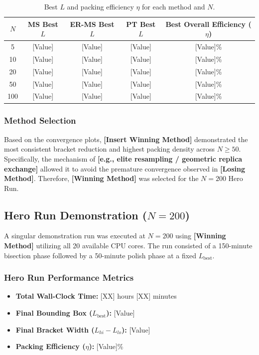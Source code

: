 \begin{table}[h]
\centering
\begin{tabular}{c|c|c|c|c}
$N$ & MS Best $L$ & ER-MS Best $L$ & PT Best $L$ & Best Overall Efficiency ($\eta$) \\
\hline
5   & [Value]     & [Value]        & [Value]     & [Value]\% \\
10  & [Value]     & [Value]        & [Value]     & [Value]\% \\
20  & [Value]     & [Value]        & [Value]     & [Value]\% \\
50  & [Value]     & [Value]        & [Value]     & [Value]\% \\
100 & [Value]     & [Value]        & [Value]     & [Value]\% \\
\end{tabular}
\caption{Best $L$ and packing efficiency $\eta$ for each method and $N$.}
\end{table}


\subsubsection{Method Selection}
Based on the convergence plots, \textbf{[Insert Winning Method]} demonstrated the most consistent bracket reduction and highest packing density across $N \geq 50$. Specifically, the mechanism of \textbf{[e.g., elite resampling / geometric replica exchange]} allowed it to avoid the premature convergence observed in \textbf{[Losing Method]}. Therefore, \textbf{[Winning Method]} was selected for the $N=200$ Hero Run.

\subsection{Hero Run Demonstration ($N=200$)}
A singular demonstration run was executed at $N=200$ using \textbf{[Winning Method]} utilizing all 20 available CPU cores. The run consisted of a 150-minute bisection phase followed by a 50-minute polish phase at a fixed $L_{\text{best}}$.

\subsubsection{Hero Run Performance Metrics}
\begin{itemize}
  \item \textbf{Total Wall-Clock Time:} [XX] hours [XX] minutes
  \item \textbf{Final Bounding Box ($L_{\text{best}}$):} [Value]
  \item \textbf{Final Bracket Width ($L_{hi} - L_{lo}$):} [Value]
  \item \textbf{Packing Efficiency ($\eta$):} [Value]\%
\end{itemize}


